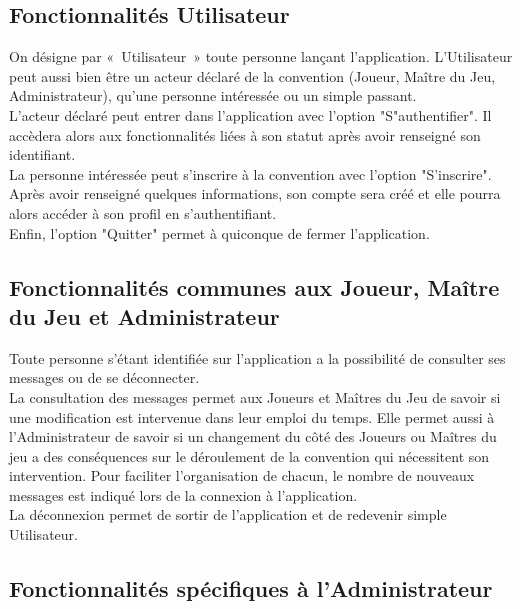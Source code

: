 \documentclass[11pt]{article}
\begin{document}
\subsection{Fonctionnalités Utilisateur}

On désigne par «~Utilisateur~» toute personne lançant l'application. L'Utilisateur peut aussi bien être un acteur déclaré de la convention (Joueur, Maître du Jeu, Administrateur), qu'une personne intéressée ou un simple passant.\\

L'acteur déclaré peut entrer dans l'application avec l'option "S"authentifier". Il accèdera alors aux fonctionnalités liées à son statut après avoir renseigné son identifiant.\\

La personne intéressée peut s'inscrire à la convention avec l'option "S'inscrire". Après avoir renseigné quelques informations, son compte sera créé et elle pourra alors accéder à son profil en s'authentifiant.\\

Enfin, l'option "Quitter" permet à quiconque de fermer l'application.\\

\subsection{Fonctionnalités communes aux Joueur, Maître du Jeu et Administrateur}

Toute personne s'étant identifiée sur l'application a la possibilité de consulter ses messages ou de se déconnecter.\\

La consultation des messages permet aux Joueurs et Maîtres du Jeu de savoir si une modification est intervenue dans leur emploi du temps. Elle permet aussi à l'Administrateur de savoir si un changement du côté des Joueurs ou Maîtres du jeu a des conséquences sur le déroulement de la convention qui nécessitent son intervention. Pour faciliter l'organisation de chacun, le nombre de nouveaux messages est indiqué lors de la connexion à l'application.\\

La déconnexion permet de sortir de l'application et de redevenir simple Utilisateur.

\subsection{Fonctionnalités spécifiques à l'Administrateur} 
\end{document}
